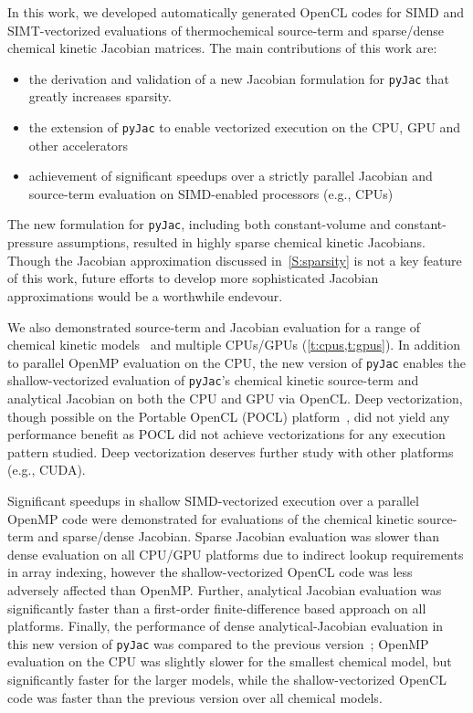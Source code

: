 \documentclass[12pt,number,sort&compress,preprint]{elsarticle}
\newcommand{\revise}[1]{{\sloppy\textcolor{RoyalPurple}{#1}}}  %
\begin{document}
In this work, we developed automatically generated OpenCL codes for SIMD and SIMT-vectorized evaluations of thermochemical source-term and sparse\slash dense chemical kinetic Jacobian matrices.
\revise{The main contributions of this work are:}
\begin{itemize}
 \item \revise{the derivation and validation of a new Jacobian formulation for \texttt{pyJac} that greatly increases sparsity.}
 \item \revise{the extension of \texttt{pyJac} to enable vectorized execution on the CPU, GPU and other accelerators}
 \item \revise{achievement of significant speedups over a strictly parallel Jacobian and source-term evaluation on SIMD-enabled processors (e.g., CPUs)}
\end{itemize}

\revise{The new formulation for \texttt{pyJac}, including both constant-volume and constant-pressure assumptions, resulted in highly sparse chemical kinetic Jacobians.}
\revise{Though the Jacobian approximation discussed in~\cref{S:sparsity} is not a key feature of this work, future efforts to develop more sophisticated Jacobian approximations would be a worthwhile endevour.}

We also demonstrated source-term and Jacobian evaluation for a range of chemical kinetic models~\cite{Burke:2011fh,smith_gri-mech_30,Wang:2007,Sarathy:2013jr} and multiple CPUs\slash GPUs (\cref{t:cpus,t:gpus}).
\revise{In addition to parallel OpenMP evaluation on the CPU, the new version of \texttt{pyJac} enables the shallow-vectorized evaluation of \texttt{pyJac}'s chemical kinetic source-term and analytical Jacobian on both the CPU and GPU via OpenCL.}
Deep vectorization, though possible on the Portable OpenCL (POCL) platform~\cite{poclIJPP}, did not yield any performance benefit as POCL did not achieve vectorizations for any execution pattern studied.
Deep vectorization deserves further study with other platforms (e.g., CUDA).

Significant speedups in shallow SIMD-vectorized execution over a parallel OpenMP code were demonstrated for evaluations of the chemical kinetic source-term and sparse\slash dense Jacobian.
Sparse Jacobian evaluation was slower than dense evaluation on all CPU\slash GPU platforms due to indirect lookup requirements in array indexing, however the shallow-vectorized OpenCL code was less adversely affected than OpenMP.
Further, analytical Jacobian evaluation was significantly faster than a first-order finite-difference based approach on all platforms.
Finally, the performance of dense analytical-Jacobian evaluation in this new version of \texttt{pyJac} was compared to the previous version~\cite{pyjac16}; OpenMP evaluation on the CPU was slightly slower for the smallest chemical model, but significantly faster for the larger models, while the shallow-vectorized OpenCL code was faster than the previous version over all chemical models.
\end{document}
